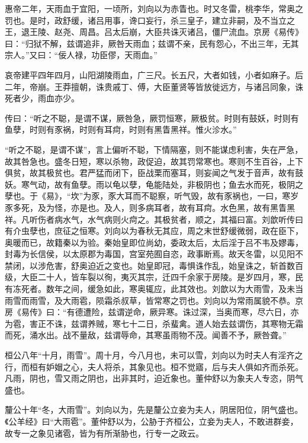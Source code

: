 \documentclass[12pt,UTF8]{ctexbook}
\begin{document}
惠帝二年，天雨血于宜阳，一顷所，刘向以为赤眚也。时又冬雷，桃李华，常奥之罚也。是时，政舒缓，诸吕用事，谗口妄行，杀三皇子，建立非嗣，及不当立之王，退王陵、赵尧、周昌。吕太后崩，大臣共诛灭诸吕，僵尸流血。京房《易传》曰：“归狱不解，兹谓追非，厥咎天雨血；兹谓不亲，民有怨心，不出三年，无其宗人。”又曰：“佞人禄，功臣僇，天雨血。”



哀帝建平四年四月，山阳湖陵雨血，广三尺。长五尺，大者如钱，小者如麻子。后二年，帝崩。王莽擅朝，诛贵戚丁、傅，大臣董贤等皆放徙远方，与诸吕同象，诛死者少，雨血亦少。



传曰：“听之不聪，是谓不谋，厥咎急，厥罚恒寒，厥极贫。时则有鼓妖，时则有鱼孽，时则有豕祸，时则有耳疴，时则有黑眚黑祥。惟火沴水。”



“听之不聪，是谓不谋”，言上偏听不聪，下情隔塞，则不能谋虑利害，失在严急，故其咎急也。盛冬日短，寒以杀物，政促迫，故其罚常寒也。寒则不生百谷，上下俱贫，故其极贫也。君严猛而闭下，臣战栗而塞耳，则妄闻之气发于音声，故有鼓妖。寒气动，故有鱼孽。雨以龟以孽，龟能陆处，非极阴也；鱼去水而死，极阴之孽也。于《易》，“坎”为豕，豕大耳而不聪察，听气毁，故有豕祸也，一曰，寒岁豕多死，及为怪，亦是也。及人，则多病耳者，故有耳疴。水色黑，故有黑眚黑祥。凡听伤者病水气，水气病则火疴之。其极贫者，顺之，其福曰富。刘歆听传曰有介虫孽也，庶征之恒寒。刘向以为春秋无其应，周之末世舒缓微弱，政在臣下，奥暖而已，故籍秦以为验。秦始皇即位尚幼，委政太后，太后淫于吕不韦及嫪毒，封毒为长信侯，以太原郡为毒国，宫室苑囿自恣，政事断焉。故天冬雷，以见阳不禁闭，以涉危害，舒奥迫近之变也。始皇即冠，毒惧诛作乱，始皇诛之，斩首数百级，大臣二十人，皆车裂以徇，夷灭其宗，迁四千余家于房陵。是岁四月，寒，民有冻死者。数年之间，缓急如此，寒奥辄应，此其效也。刘歆以为大雨雪，及未当雨雪而雨雪，及大雨雹，陨霜杀叔草，皆常寒之罚也。刘向以为常雨属貌不恭。京房《易传》曰：“有德遭险，兹谓逆命，厥异寒。诛过深，当奥而寒，尽六日，亦为雹，害正不诛，兹谓养贼，寒七十二日，杀蜚禽。道人始去兹谓伤，其寒物无霜而死，涌水出。战不量敌，兹谓辱命，其寒虽雨物不茂。闻善不予，厥咎聋。”



桓公八年“十月，雨雪”。周十月，今八月也，未可以雪，刘向以为时夫人有淫齐之行，而桓有妒媢之心，夫人将杀，其象见也。桓不觉寤，后与夫人俱如齐而杀死。凡雨，阴也，雪又雨之阴也，出非其时，迫近象也。董仲舒以为象夫人专恣，阴气盛也。



釐公十年“冬，大雨雪”。刘向以为，先是釐公立妾为夫人，阴居阳位，阴气盛也。《公羊经》曰“大雨雹”。董仲舒以为，公胁于齐桓公，立妾为夫人，不敢进群妾，故专一之象见诸雹，皆为有所渐胁也，行专一之政云。
\end{document}
